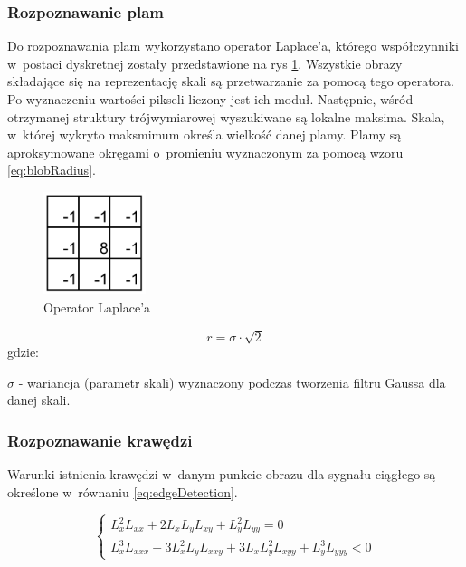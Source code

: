 \subsubsection{Rozpoznawanie plam}
\label{subsubsec:rozpoznawaniePlam}

Do rozpoznawania plam wykorzystano operator Laplace'a, którego współczynniki w~postaci dyskretnej zostały przedstawione na rys \ref{fig:laplacian_kernel}. Wszystkie obrazy składające się na reprezentację skali są przetwarzanie za pomocą tego operatora. Po wyznaczeniu wartości pikseli liczony jest ich moduł. Następnie, wśród otrzymanej struktury trójwymiarowej wyszukiwane są lokalne maksima. Skala, w~której wykryto maksmimum określa wielkość danej plamy. Plamy są aproksymowane okręgami o~promieniu wyznaczonym za pomocą wzoru \eqref{eq:blobRadius}.

\begin{figure}
\begin{center}
\includegraphics[width=3cm]{laplacian.pdf}
\end{center}
\caption{Operator Laplace'a}
\label{fig:laplacian_kernel}
\end{figure}

\begin{equation}
\label{eq:blobRadius}
r = \sigma \cdot \sqrt{2}
\end{equation}
gdzie:

$ \sigma $ - wariancja (parametr skali) wyznaczony podczas tworzenia filtru Gaussa dla danej skali.

\subsubsection{Rozpoznawanie krawędzi}
\label{subsubsec:rozpoznawanieKrawedzi}

Warunki istnienia krawędzi w~danym punkcie obrazu dla sygnału ciągłego są określone w~równaniu \eqref{eq:edgeDetection}.

\begin{equation}
\label{eq:edgeDetection}
\left\{ \begin{array}{rl}
L_x^2 L_{xx} + 2L_xL_yL_{xy} + L_y^2L_{yy} = 0 \\
L_x^3L_{xxx} + 3L_x^2L_yL_{xxy} + 3L_xL_y^2L_{xyy} + L_y^3L_{yyy} < 0
\end{array} \right.
\end{equation}

